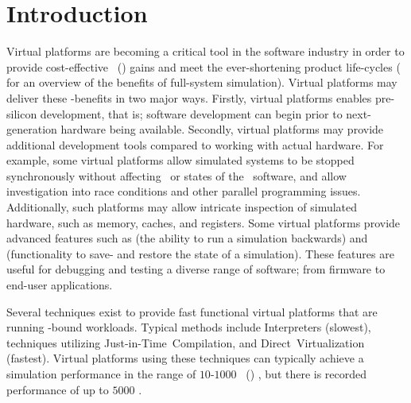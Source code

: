 
\chapter*{Introduction}
\label{cha:introduction}
Virtual platforms are becoming a critical tool in the software industry in order to provide cost-effective \termtimetomarket ~(\termttm) gains and meet the ever-shortening product life-cycles ( for an overview of the benefits of full-system simulation).
Virtual platforms may deliver these \termttm -benefits in two major ways.
Firstly, virtual platforms enables pre-silicon development, that is; software development can begin prior to next-generation hardware being available.
Secondly, virtual platforms may provide additional development tools compared to working with actual hardware.
For example, some virtual platforms allow simulated systems to be stopped synchronously without affecting \termtiming\ or states of the \termtarget\ software, and allow investigation into race conditions and other parallel programming issues.
Additionally, such platforms may allow intricate inspection of simulated hardware, such as memory, caches, and registers.
Some virtual platforms provide advanced features such as \termrevexe {} (the ability to run a simulation backwards) and \termcheckpointing {} (functionality to save- and restore the state of a simulation). 
These features are useful for debugging and testing a diverse range of software; from firmware to end-user applications.

Several techniques exist to provide fast functional virtual platforms that are running \termcpu -bound workloads. Typical methods include Interpreters (slowest), techniques utilizing Just-in-Time~Compilation, and Direct~Virtualization (fastest).
Virtual platforms using these techniques can typically achieve a simulation performance in the range of $10$-$1000$ \termmillioninstructionspersecond\ (\termmips ) , but there is recorded performance of up to $5000$ \termmips {}.\\

